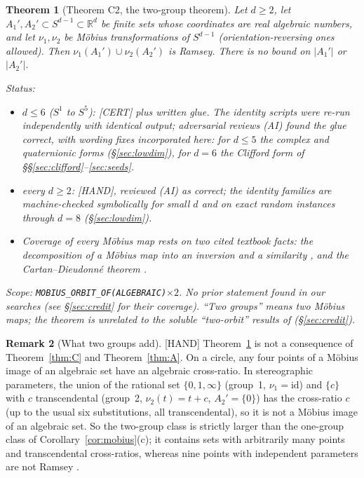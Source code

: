 \documentclass[11pt]{amsart}
\newcommand{\st}[1]{\textsf{[#1]}}
\newcommand{\R}{\mathbb{R}}
\theoremstyle{plain}
\newtheorem{theorem}{Theorem}[section]
\theoremstyle{definition}
\newtheorem{remark}[theorem]{Remark}
\begin{document}
\begin{theorem}[Theorem C2, the two-group theorem]\label{thm:C2}
Let $d\ge2$, let $A_1',A_2'\subset S^{d-1}\subset\R^d$ be finite sets whose coordinates are real
algebraic numbers, and let $\nu_1,\nu_2$ be M\"obius transformations of $S^{d-1}$
(orientation-reversing ones allowed). Then $\nu_1(A_1')\cup\nu_2(A_2')$ is Ramsey. There is no bound
on $|A_1'|$ or $|A_2'|$.

\smallskip\noindent\emph{Status:}
\begin{itemize}
\item $d\le6$ ($S^1$ to $S^5$): \st{CERT} plus written glue. The identity scripts were re-run
independently with identical output; adversarial reviews (AI) found the glue correct, with wording fixes
incorporated here: for $d\le5$ the complex and quaternionic forms (\S\ref{sec:lowdim}), for $d=6$
the Clifford form of \S\S\ref{sec:clifford}--\ref{sec:seeds}.
\item every $d\ge2$: \st{HAND}, reviewed (AI) as correct; the identity families are
machine-checked symbolically for small $d$ and on exact random instances through $d=8$
(\S\ref{sec:lowdim}).
\item Coverage of every M\"obius map rests on two cited textbook facts: the decomposition of a
M\"obius map into an inversion and a similarity \cite{Beardon}, and the Cartan--Dieudonn\'e
theorem \cite{CartanDieudonne}.
\end{itemize}
Scope: \texttt{MOBIUS\_ORBIT\_OF(ALGEBRAIC)}$\times2$. No prior statement found in our searches (see
\S\ref{sec:credit} for their coverage). ``Two groups'' means two M\"obius maps;
the theorem is unrelated to the soluble ``two-orbit'' results of \cite{Kriz91,Behague}
(\S\ref{sec:credit}).
\end{theorem}

\begin{remark}[What two groups add]\label{rem:beyond}
\st{HAND} Theorem~\ref{thm:C2} is not a consequence of Theorem~\ref{thm:C} and
Theorem~\ref{thm:A}. On a circle, any four points of a M\"obius image of an algebraic set have an
algebraic cross-ratio. In stereographic parameters, the union of the rational set $\{0,1,\infty\}$
(group~1, $\nu_1=\mathrm{id}$) and $\{c\}$ with $c$ transcendental (group~2, $\nu_2(t)=t+c$,
$A_2'=\{0\}$) has the cross-ratio $c$ (up to the usual six substitutions, all transcendental), so it is not a
M\"obius image of an algebraic set. So the two-group class is strictly larger than the one-group class
of Corollary~\ref{cor:mobius}(c); it contains sets with arbitrarily many points and transcendental
cross-ratios, whereas nine points with independent parameters are not Ramsey
\cite[Prop.~7.6]{OAI172}.
\end{remark}
\end{document}
